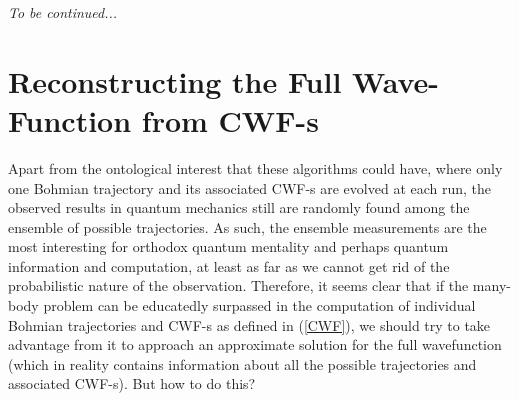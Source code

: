 \documentclass[11pt, a4paper]{article} %
\begin{document}
{\em To be continued...}














\newpage
\section{Reconstructing the Full Wave-Function from CWF-s}
Apart from the ontological interest that these algorithms could have, where only one Bohmian trajectory and its associated CWF-s are evolved at each run, the observed results in quantum mechanics still are randomly found among the ensemble of possible trajectories. As such, the ensemble measurements are the most interesting for orthodox quantum mentality and perhaps quantum information and computation, at least as far as we cannot get rid of the probabilistic nature of the observation. Therefore, it seems clear that if the many-body problem can be educatedly surpassed in the computation of individual Bohmian trajectories and CWF-s as defined in (\ref{CWF}), we should try to take advantage from it to approach an approximate solution for the full wavefunction (which in reality contains information about all the possible trajectories and associated CWF-s). But how to do this?
\end{document}
